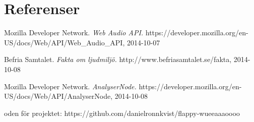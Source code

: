 \documentclass[12pt, titlepage, a4paper]{article}
\begin{document}
	\section{Referenser}
	\renewcommand{\addcontentsline}[3]{}%
  \renewcommand{\section}[2]{}%
  \begin{thebibliography}{1}

    Mozilla Developer Network.
    \emph{Web Audio API.}
    https://developer.mozilla.org/en-US/docs/Web/API/Web\_Audio\_API, 2014-10-07

    Befria Samtalet.
    \emph{Fakta om ljudmiljö.}
    http://www.befriasamtalet.se/fakta, 2014-10-08

    Mozilla Developer Network.
    \emph{AnalyserNode.}
    https://developer.mozilla.org/en-US/docs/Web/API/AnalyserNode, 2014-10-08
  \end{thebibliography}

  \section{Bilagor}
  Koden för projektet: https://github.com/danielronnkvist/flappy-wueeaaaoooo
\end{document}
